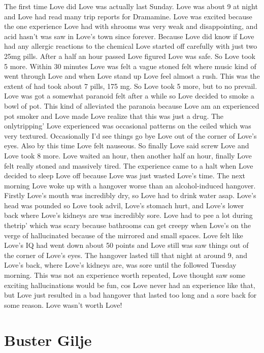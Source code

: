 \documentclass[12pt]{book}
\begin{document}
The first time Love did Love was actually last Sunday. Love was about 9 at night and Love had read many trip reports for Dramamine. Love was excited because the one experience Love had with shrooms was very weak and disappointing, and acid hasn't was saw in Love's town since forever. Because Love did know if Love had any allergic reactions to the chemical Love started off carefully with just two 25mg pills. After a half an hour passed Love figured Love was safe. So Love took 5 more. Within 30 minutes Love was felt a vague stoned felt where music kind of went through Love and when Love stand up Love feel almost a rush. This was the extent of had took about 7 pills, 175 mg. So Love took 5 more, but to no prevail. Love was got a somewhat paranoid felt after a while so Love decided to smoke a bowl of pot. This kind of alleviated the paranoia because Love am an experienced pot smoker and Love made Love realize that this was just a drug. The onlytripping' Love experienced was occasional patterns on the ceiled which was very textured. Occasionally I'd see things go bye Love out of the corner of Love's eyes. Also by this time Love felt nauseous. So finally Love said screw Love and Love took 8 more. Love waited an hour, then another half an hour, finally Love felt really stoned and massively tired. The experience came to a halt when Love decided to sleep Love off because Love was just wasted Love's time. The next morning Love woke up with a hangover worse than an alcohol-induced hangover. Firstly Love's mouth was incredibly dry, so Love had to drink water asap. Love's head was pounded so Love took advil, Love's stomach hurt, and Love's lower back where Love's kidneys are was incredibly sore. Love had to pee a lot during thetrip' which was scary because bathrooms can get creepy when Love's on the verge of hallucinated because of the mirrored and small spaces. Love felt like Love's IQ had went down about 50 points and Love still was saw things out of the corner of Love's eyes. The hangover lasted till that night at around 9, and Love's back, where Love's kidneys are, was sore until the followed Tuesday morning. This was not an experience worth repeated, Love thought saw some exciting hallucinations would be fun, cos Love never had an experience like that, but Love just resulted in a bad hangover that lasted too long and a sore back for some reason. Love wasn't worth Love!



\chapter{Buster Gilje}
\end{document}
